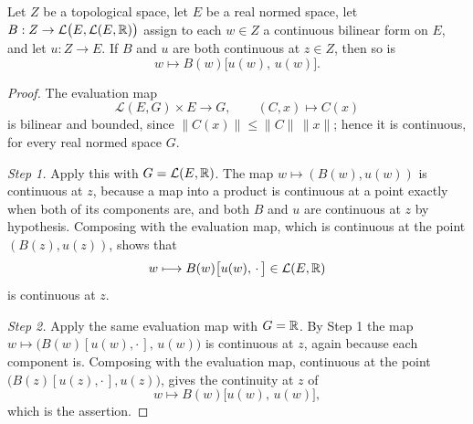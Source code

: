 \begin{lemma}
Let $Z$ be a topological space, let $E$ be a real normed space, let
$B:Z\to\mathcal L\bigl(E,\mathcal L(E,\mathbb{R})\bigr)$ assign to each $w\in Z$ a continuous
bilinear form on $E$, and let $u:Z\to E$. If $B$ and $u$ are both continuous at
$z\in Z$, then so is
\[
  w\longmapsto B(w)\bigl[u(w),\,u(w)\bigr].
\]
\end{lemma}
\begin{proof}
The evaluation map
\[
  \mathcal L(E,G)\times E\longrightarrow G,\qquad (C,x)\longmapsto C(x)
\]
is bilinear and bounded, since $\|C(x)\|\le\|C\|\,\|x\|$; hence it is continuous, for
every real normed space $G$.

\emph{Step 1.} Apply this with $G=\mathcal L(E,\mathbb{R})$. The map $w\mapsto(B(w),u(w))$ is
continuous at $z$, because a map into a product is continuous at a point exactly when
both of its components are, and both $B$ and $u$ are continuous at $z$ by hypothesis.
Composing with the evaluation map, which is continuous at the point $(B(z),u(z))$, shows
that
\[
  w\longmapsto B(w)\bigl[u(w),\,\cdot\,\bigr]\in\mathcal L(E,\mathbb{R})
\]
is continuous at $z$.

\emph{Step 2.} Apply the same evaluation map with $G=\mathbb{R}$. By Step 1 the map
$w\mapsto\bigl(B(w)[u(w),\cdot\,],\,u(w)\bigr)$ is continuous at $z$, again because each
component is. Composing with the evaluation map, continuous at the point
$\bigl(B(z)[u(z),\cdot\,],u(z)\bigr)$, gives the continuity at $z$ of
\[
  w\longmapsto B(w)\bigl[u(w),\,u(w)\bigr],
\]
which is the assertion.
\end{proof}
